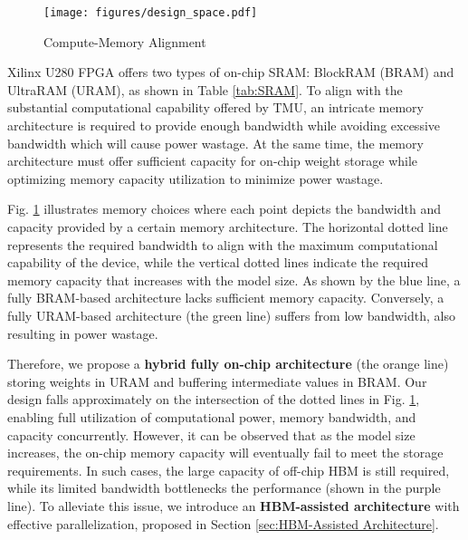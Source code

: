\begin{figure}
    \vspace{-5mm}
    \centering
    \texttt{[image: figures/design\_space.pdf]}
    \caption{Compute-Memory Alignment}
    \label{fig:Alignment}
    \vspace{-7mm}
\end{figure}

Xilinx U280 FPGA offers two types of on-chip SRAM: BlockRAM (BRAM) and UltraRAM (URAM), as shown in Table \ref{tab:SRAM}. 
To align with the substantial computational capability offered by TMU, an intricate memory architecture is required to provide enough bandwidth while avoiding excessive bandwidth which will cause power wastage. 
At the same time, the memory architecture must offer sufficient capacity for on-chip weight storage while optimizing memory capacity utilization to minimize power wastage.

\begin{table}[h]
    \vspace{-3mm}
    \centering
    \caption{Attibutes of On-chip BRAM and URAM on U280}
    \label{tab:SRAM} 
    \vspace{-3mm}
\end{table}
Fig. \ref{fig:Alignment} illustrates memory choices where each point depicts the bandwidth and capacity provided by a certain memory architecture. The horizontal dotted line represents the required bandwidth to align with the maximum computational capability of the device, while the vertical dotted lines indicate the required memory capacity that increases with the model size. As shown by the blue line, a fully BRAM-based architecture lacks sufficient memory capacity. Conversely, a fully URAM-based architecture (the green line) suffers from low bandwidth, also resulting in power wastage.

Therefore, we propose a \textbf{hybrid fully on-chip architecture} (the orange line) storing weights in URAM and buffering intermediate values in BRAM. Our design falls approximately on the intersection of the dotted lines in Fig. \ref{fig:Alignment}, enabling full utilization of computational power, memory bandwidth, and capacity concurrently. However, it can be observed that as the model size increases, the on-chip memory capacity will eventually fail to meet the storage requirements. In such cases, the large capacity of off-chip HBM is still required, while its limited bandwidth bottlenecks the performance (shown in the purple line). To alleviate this issue, we introduce an \textbf{HBM-assisted architecture} with effective parallelization, proposed in Section \ref{sec:HBM-Assisted Architecture}.





